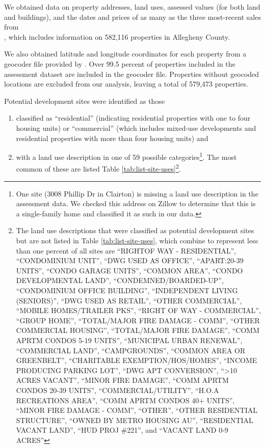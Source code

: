 \documentclass[
]{book}
\providecommand{\tightlist}{%
  \setlength{\itemsep}{0pt}\setlength{\parskip}{0pt}}
\theoremstyle{definition}
\theoremstyle{definition}
\theoremstyle{definition}
\theoremstyle{definition}
\theoremstyle{remark}
\begin{document}
We obtained data on property addresses, land uses, assessed values (for both
land and buildings), and the dates and prices of as many as the three
most-recent sales from\\
\citet{allegheny_county_office_of_property_assessments_allegheny_2022}, which
includes information on 582,116 properties in Allegheny County.

We also obtained latitude and longitude coordinates for each property from a
geocoder file provided by \citet{western_pennsylvania_regional_data_center_geocoders_2021}.
Over 99.5 percent of properties included in the assessment dataset are included
in the geocoder file. Properties without geocoded locations are excluded from
our analysis, leaving a total of 579,473 properties.

Potential development sites were identified as those

\begin{enumerate}
\def\labelenumi{\arabic{enumi}.}
\tightlist
\item
  classified as ``residential''
  (indicating residential properties with one to four housing units) or ``commercial''
  (which includes mixed-use developments and residential properties with more than four
  housing units) and
\item
  with a land use description in one of 59 possible categories\footnote{One site (3008 Phillip Dr in Clairton) is missing a land use description in the assessment data. We checked this address on Zillow to determine that this is a single-family home and classified it as such in our data.}. The most common of
  these are listed Table \ref{tab:list-site-uses}\footnote{The land use descriptions that were
    classified as potential development sites but are not listed in Table
    \ref{tab:list-site-uses}, which combine to represent less than one percent of all sites
    are ``RIGHTOF WAY - RESIDENTIAL'', ``CONDOMINIUM UNIT'', ``DWG USED AS OFFICE'',
    ``APART:20-39 UNITS'', ``CONDO GARAGE UNITS'', ``COMMON AREA'', ``CONDO DEVELOPMENTAL
    LAND'', ``CONDEMNED/BOARDED-UP'', ``CONDOMINIUM OFFICE BUILDING'', ``INDEPENDENT LIVING
    (SENIORS)'', ``DWG USED AS RETAIL'', ``OTHER COMMERCIAL'', ``MOBILE HOMES/TRAILER PKS'',
    ``RIGHT OF WAY - COMMERCIAL'', ``GROUP HOME'', ``TOTAL/MAJOR FIRE DAMAGE - COMM'',
    ``OTHER COMMERCIAL HOUSING'', ``TOTAL/MAJOR FIRE DAMAGE'', ``COMM APRTM CONDOS 5-19
    UNITS'', ``MUNICIPAL URBAN RENEWAL'', ``COMMERCIAL LAND'', ``CAMPGROUNDS'', ``COMMON AREA
    OR GREENBELT'', ``CHARITABLE EXEMPTION/HOS/HOMES'', ``INCOME PRODUCING PARKING LOT'',
    ``DWG APT CONVERSION'', ``\textgreater10 ACRES VACANT'', ``MINOR FIRE DAMAGE'', ``COMM APRTM CONDOS
    20-39 UNITS'', ``COMMERCIAL/UTILITY'',
    ``H.O.A RECREATIONS AREA'', ``COMM APRTM CONDOS 40+ UNITS'', ``MINOR FIRE DAMAGE - COMM'',
    ``OTHER'', ``OTHER RESIDENTIAL STRUCTURE'', ``OWNED BY METRO HOUSING AU'', ``RESIDENTIAL VACANT
    LAND'', ``HUD PROJ \#221'', and ``VACANT LAND 0-9 ACRES''}.
\end{enumerate}
\end{document}
